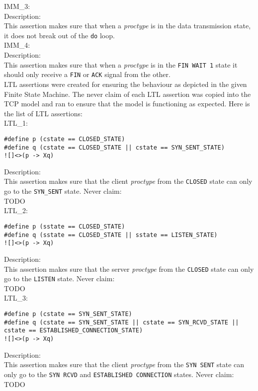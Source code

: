 \documentclass{WigReport}
\begin{document}
IMM\_3:\\
Description:\\
This assertion makes sure that when a \textit{proctype} is in the data transmission state, it does not break out of the \verb|do| loop.
\\

IMM\_4:\\
Description:\\
This assertion makes sure that when a \textit{proctype} is in the \verb|FIN WAIT 1| state it should only receive a \verb|FIN| or \verb|ACK| signal from the other.
\\

LTL assertions were created for ensuring the behaviour as depicted in the given Finite State Machine. The never claim of each LTL assertion was copied into the TCP model and ran to ensure that the model is functioning as expected. Here is the list of LTL assertions:
\\

LTL\_1:\\
\begin{verbatim}
#define p (cstate == CLOSED_STATE)
#define q (cstate == CLOSED_STATE || cstate == SYN_SENT_STATE)
![]<>(p -> Xq)
\end{verbatim}
Description:\\
This assertion makes sure that the client \textit{proctype} from the \verb|CLOSED| state can only go to the \verb|SYN_SENT| state.
Never claim:\\
TODO\\

LTL\_2:\\
\begin{verbatim}
#define p (sstate == CLOSED_STATE)
#define q (sstate == CLOSED_STATE || sstate == LISTEN_STATE)
![]<>(p -> Xq)
\end{verbatim}
Description:\\
This assertion makes sure that the server \textit{proctype} from the \verb|CLOSED| state can only go to the \verb|LISTEN| state.
Never claim:\\
TODO\\

LTL\_3:\\
\begin{verbatim}
#define p (cstate == SYN_SENT_STATE)
#define q (cstate == SYN_SENT_STATE || cstate == SYN_RCVD_STATE || cstate == ESTABLISHED_CONNECTION_STATE)
![]<>(p -> Xq)
\end{verbatim}
Description:\\
This assertion makes sure that the client \textit{proctype} from the \verb|SYN SENT| state can only go to the \verb|SYN RCVD| and \verb|ESTABLISHED CONNECTION| states.
Never claim:\\
TODO\\
\end{document}
